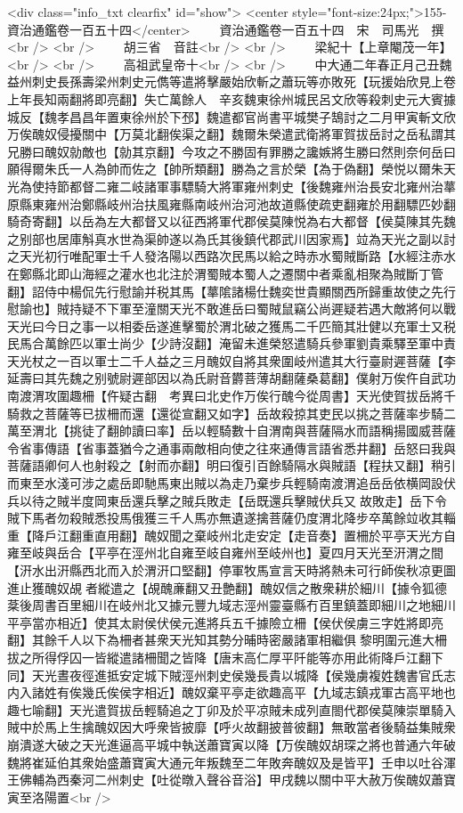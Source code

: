 <div class="info_txt clearfix" id="show">
<center style="font-size:24px;">155-資治通鑑卷一百五十四</center>
  　　資治通鑑卷一百五十四　宋　司馬光　撰<br />
<br />
　　胡三省　音註<br />
<br />
　　梁紀十【上章閹茂一年】<br />
<br />
　　高祖武皇帝十<br />
<br />
　　中大通二年春正月己丑魏益州刺史長孫壽梁州刺史元儁等遣將擊嚴始欣斬之蕭玩等亦敗死【玩援始欣見上卷上年長知兩翻將即亮翻】失亡萬餘人　辛亥魏東徐州城民呂文欣等殺刺史元大賓據城反【魏孝昌昌年置東徐州於下邳】魏遣都官尚書平城樊子鵠討之二月甲寅斬文欣　万俟醜奴侵擾關中【万莫北翻俟渠之翻】魏爾朱榮遣武衛將軍賀拔岳討之岳私謂其兄勝曰醜奴勍敵也【勍其京翻】今攻之不勝固有罪勝之讒嫉將生勝曰然則奈何岳曰願得爾朱氏一人為帥而佐之【帥所類翻】勝為之言於榮【為于偽翻】榮悦以爾朱天光為使持節都督二雍二岐諸軍事驃騎大將軍雍州刺史【後魏雍州治長安北雍州治蕐原縣東雍州治鄭縣岐州治扶風雍縣南岐州治河池故道縣使疏吏翻雍於用翻驃匹妙翻騎奇寄翻】以岳為左大都督又以征西將軍代郡侯莫陳悦為右大都督【侯莫陳其先魏之别部也居庫斛真水世為渠帥遂以為氏其後鎮代郡武川因家焉】竝為天光之副以討之天光初行唯配軍士千人發洛陽以西路次民馬以給之時赤水蜀賊斷路【水經注赤水在鄭縣北即山海經之灌水也北注於渭蜀賊本蜀人之遷關中者乘亂相聚為賊斷丁管翻】詔侍中楊侃先行慰諭并税其馬【蕐隂諸楊仕魏奕世貴顯關西所歸重故使之先行慰諭也】賊持疑不下軍至潼關天光不敢進岳曰蜀賊鼠竊公尚遲疑若遇大敵將何以戰天光曰今日之事一以相委岳遂進擊蜀於渭北破之獲馬二千匹簡其壯健以充軍士又税民馬合萬餘匹以軍士尚少【少詩沒翻】淹留未進榮怒遣騎兵參軍劉貴乘驛至軍中責天光杖之一百以軍士二千人益之三月醜奴自將其衆圍岐州遣其大行臺尉遲菩薩【李延壽曰其先魏之别號尉遲部因以為氏尉音欝菩薄胡翻薩桑葛翻】僕射万俟仵自武功南渡渭攻圍趣柵【仵疑古翻　考異曰北史作万俟行醜今從周書】天光使賀拔岳將千騎救之菩薩等已拔柵而還【還從宣翻又如字】岳故殺掠其吏民以挑之菩薩率步騎二萬至渭北【挑徒了翻帥讀曰率】岳以輕騎數十自渭南與菩薩隔水而語稱揚國威菩薩令省事傳語【省事蓋猶今之通事兩敵相向使之往來通傳言語省悉井翻】岳怒曰我與菩薩語卿何人也射殺之【射而亦翻】明曰復引百餘騎隔水與賊語【程扶又翻】稍引而東至水淺可涉之處岳即馳馬東出賊以為走乃棄步兵輕騎南渡渭追岳岳依横岡設伏兵以待之賊半度岡東岳還兵擊之賊兵敗走【岳既還兵擊賊伏兵又故敗走】岳下令賊下馬者勿殺賊悉投馬俄獲三千人馬亦無遺遂擒菩薩仍度渭北降步卒萬餘竝收其輜重【降戶江翻重直用翻】醜奴聞之棄岐州北走安定【走音奏】置柵於平亭天光方自雍至岐與岳合【平亭在涇州北自雍至岐自雍州至岐州也】夏四月天光至汧渭之間【汧水出汧縣西北而入於渭汧口堅翻】停軍牧馬宣言天時將熱未可行師俟秋凉更圖進止獲醜奴覘者縱遣之【覘醜亷翻又丑艶翻】醜奴信之散衆耕於細川【據令狐德棻後周書百里細川在岐州北又據元豐九域志涇州靈臺縣冇百里鎮蓋即細川之地細川平亭當亦相近】使其太尉侯伏侯元進將兵五千據險立柵【侯伏侯虜三字姓將即亮翻】其餘千人以下為柵者甚衆天光知其勢分晡時密嚴諸軍相繼俱黎明圍元進大柵拔之所得俘囚一皆縱遣諸柵聞之皆降【唐末高仁厚平阡能等亦用此術降戶江翻下同】天光晝夜徑進抵安定城下賊涇州刺史侯幾長貴以城降【侯幾虜複姓魏書官氏志内入諸姓有俟幾氏俟侯字相近】醜奴棄平亭走欲趣高平【九域志鎮戎軍古高平地也趣七喻翻】天光遣賀拔岳輕騎追之丁卯及於平凉賊未成列直閤代郡侯莫陳崇單騎入賊中於馬上生擒醜奴因大呼衆皆披靡【呼火故翻披普彼翻】無敢當者後騎益集賊衆崩潰遂大破之天光進逼高平城中執送蕭寶寅以降【万俟醜奴胡琛之將也普通六年破魏將崔延伯其衆始盛蕭寶寅大通元年叛魏至二年敗奔醜奴及是皆平】壬申以吐谷渾王佛輔為西秦河二州刺史【吐從暾入聲谷音浴】甲戌魏以關中平大赦万俟醜奴蕭寶寅至洛陽置<br />
